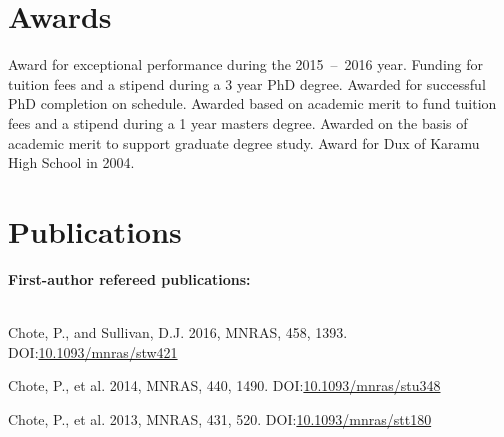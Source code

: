 \documentclass[print]{cv-style}
\begin{document}

\section{Awards}
\begin{entrylist}
{Award for exceptional performance during the 2015~--~2016 year.}
{Funding for tuition fees and a stipend during a 3 year PhD degree.}
{Awarded for successful PhD completion on schedule.}
{Awarded based on academic merit to fund tuition fees and a stipend during a 1 year masters degree.}
{Awarded on the basis of academic merit to support graduate degree study.}
\vspace{-3mm}
\vspace{-3mm}
{Award for Dux of Karamu High School in 2004.}
\end{entrylist}



\section{Publications}
{\bf First-author refereed publications:}\\
~\vspace{-2mm}\\
\begin{entrylist}
  {\small Chote, P., and Sullivan, D.J. 2016, MNRAS, 458, 1393. \textsc{DOI:}\href{http://dx.doi.org/10.1093/mnras/stw421}{10.1093/mnras/stw421}}

  {\small Chote, P., et al. 2014, MNRAS, 440, 1490. \textsc{DOI:}\href{http://dx.doi.org/10.1093/mnras/stu348}{10.1093/mnras/stu348}}
  
  {\small Chote, P., et al. 2013, MNRAS, 431, 520. \textsc{DOI:}\href{http://dx.doi.org/10.1093/mnras/stt180}{10.1093/mnras/stt180}}
\end{entrylist}\\
\pagebreak\\
\end{document}
